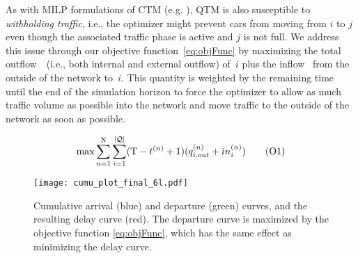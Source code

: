 


As with MILP formulations of CTM (e.g. ),
QTM is also susceptible to \emph{withholding traffic}, i.e., the
optimizer might prevent cars from moving from $i$ to $j$ even though the
associated traffic phase is active and $j$ is not full.
%
We address this issue through our objective function~\eqref{eq:objFunc} by
maximizing the total outflow~~(i.e., both internal and external outflow)
of~$i$ plus the inflow~ from the outside of the network to~$i$.
%
This quantity is weighted by the remaining time until the end of the simulation
horizon \TMAX to force the optimizer to allow as much traffic volume as possible
into the network and move traffic to the outside of the network as soon as
possible.


\begin{equation}
\max 
 \sum_{n=1}^{\mathrm{N}} \sum_{i=1}^{|\mathcal{\mathcal{Q}}|} (\mathrm{T} - t^{(n)} + 1) (q_{i,out}^{(n)} + in_{i}^{(n)})
\tag{O1}\label{eq:objFunc}
\end{equation}


\begin{figure*}[t!]
\centering
\texttt{[image: cumu\_plot\_final\_6l.pdf]}
\caption{Cumulative arrival (blue) and departure (green) curves, and the
resulting delay curve (red). The departure curve is maximized by the objective
function \eqref{eq:objFunc}, which has the same effect as minimizing the delay
curve.}
\label{fig:cumu_delay_plot}
\end{figure*}


